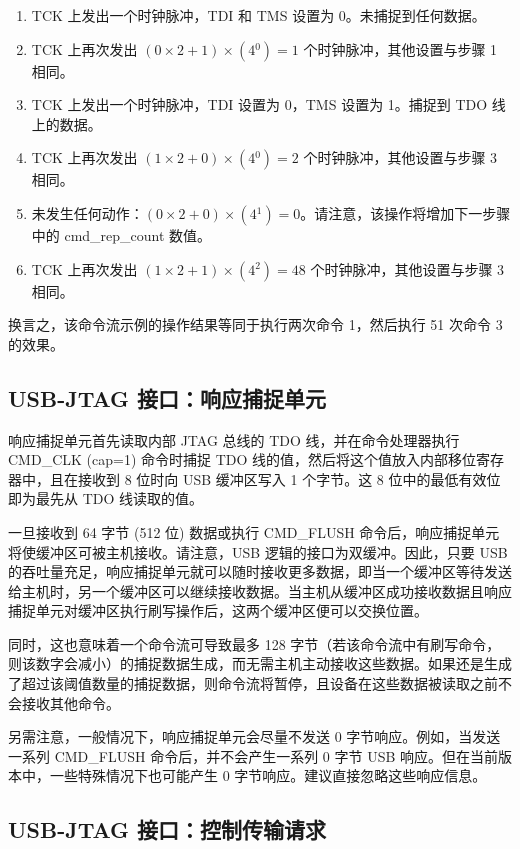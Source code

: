 \documentclass[main\_\_CN.tex]{subfiles}
\begin{document}
\begin{enumerate}
\item TCK 上发出一个时钟脉冲，TDI 和 TMS 设置为 0。未捕捉到任何数据。
\item TCK 上再次发出 \((0\times2+1)\times(4{^0})=1\) 个时钟脉冲，其他设置与步骤 1 相同。
\item TCK 上发出一个时钟脉冲，TDI 设置为 0，TMS 设置为 1。捕捉到 TDO 线上的数据。
\item TCK 上再次发出 \((1\times2+0)\times(4{^0})=2\) 个时钟脉冲，其他设置与步骤 3 相同。
\item 未发生任何动作：\((0\times2+0)\times(4{^1})=0\)。请注意，该操作将增加下一步骤中的 cmd\_rep\_count 数值。
\item TCK 上再次发出 \((1\times2+1)\times(4{^2})=48\) 个时钟脉冲，其他设置与步骤 3 相同。
\end{enumerate}

换言之，该命令流示例的操作结果等同于执行两次命令 1，然后执行 51 次命令 3 的效果。

\subsection{USB-JTAG 接口：响应捕捉单元}

响应捕捉单元首先读取内部 JTAG 总线的 TDO 线，并在命令处理器执行 CMD\_CLK (cap=1) 命令时捕捉 TDO 线的值，然后将这个值放入内部移位寄存器中，且在接收到 8 位时向 USB 缓冲区写入 1 个字节。这 8 位中的最低有效位即为最先从 TDO 线读取的值。

一旦接收到 64 字节 (512 位) 数据或执行 CMD\_FLUSH 命令后，响应捕捉单元将使缓冲区可被主机接收。请注意，USB 逻辑的接口为双缓冲。因此，只要 USB 的吞吐量充足，响应捕捉单元就可以随时接收更多数据，即当一个缓冲区等待发送给主机时，另一个缓冲区可以继续接收数据。当主机从缓冲区成功接收数据且响应捕捉单元对缓冲区执行刷写操作后，这两个缓冲区便可以交换位置。

同时，这也意味着一个命令流可导致最多 128 字节（若该命令流中有刷写命令，则该数字会减小）的捕捉数据生成，而无需主机主动接收这些数据。如果还是生成了超过该阈值数量的捕捉数据，则命令流将暂停，且设备在这些数据被读取之前不会接收其他命令。

另需注意，一般情况下，响应捕捉单元会尽量不发送 0 字节响应。例如，当发送一系列 CMD\_FLUSH 命令后，并不会产生一系列 0 字节 USB 响应。但在当前版本中，一些特殊情况下也可能产生 0 字节响应。建议直接忽略这些响应信息。

\subsection{USB-JTAG 接口：控制传输请求}
\end{document}
